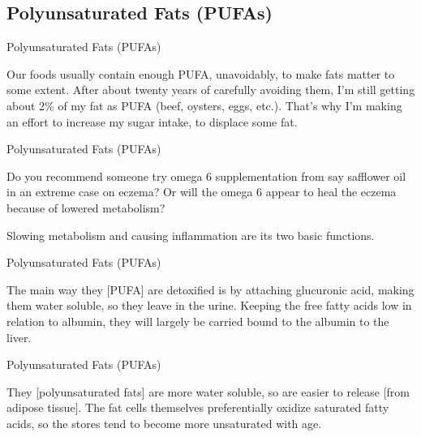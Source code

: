 \documentclass[11pt,oneside,openany,extrafontsizes]{memoir}
\begin{document}
\subsection{Polyunsaturated Fats (PUFAs)}

\begin{standalonequote}{Polyunsaturated Fats (PUFAs)}

    \begin{answer}
        Our foods usually contain enough PUFA, unavoidably, to make fats matter to some extent. After about twenty years of carefully avoiding them, I'm still getting about 2\% of my fat as PUFA (beef, oysters, eggs, etc.). That's why I'm making an effort to increase my sugar intake, to displace some fat.
    \end{answer}
\end{standalonequote}

\begin{qaexchange}{Polyunsaturated Fats (PUFAs)}

    \begin{question}
        Do you recommend someone try omega 6 supplementation from say safflower oil in an extreme case on eczema? Or will the omega 6 appear to heal the eczema because of lowered metabolism?
    \end{question}

    \begin{answer}
        Slowing metabolism and causing inflammation are its two basic functions.
    \end{answer}
\end{qaexchange}

\begin{standalonequote}{Polyunsaturated Fats (PUFAs)}

    \begin{answer}
        The main way they [PUFA] are detoxified is by attaching glucuronic acid, making them water soluble, so they leave in the urine. Keeping the free fatty acids low in relation to albumin, they will largely be carried bound to the albumin to the liver.
    \end{answer}
\end{standalonequote}

\begin{standalonequote}{Polyunsaturated Fats (PUFAs)}

    \begin{answer}
        They [polyunsaturated fats] are more water soluble, so are easier to release [from adipose tissue]. The fat cells themselves preferentially oxidize saturated fatty acids, so the stores tend to become more unsaturated with age.
    \end{answer}
\end{standalonequote}
\end{document}
